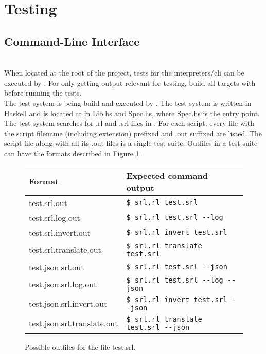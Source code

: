 \section{Testing}


\subsection{Command-Line Interface}
\\

When located at the root of the project, tests for the interpreters/cli can be executed by .
For only getting output relevant for testing, build all targets with  before running the tests.\\

The test-system is being build and executed by .
The test-system is written in Haskell and is located at  in Lib.hs and Spec.hs, where Spec.hs is the entry point.
The test-system searches for .rl and .srl files in .
For each script, every file with the script filename (including extension) prefixed and .out suffixed are listed.
The script file along with all its .out files is a single test suite.
Outfiles in a test-suite can have the formats described in Figure \ref{fig:test_suite_formats}.

\begin{figure}[H]
  \center
  \begin{tabular}{|l|l|}\hline
    \textbf{Format}             & \textbf{Expected command output}\\\hline
    test.srl.out                & \texttt{\$ srl.rl test.srl}\\\hline
    test.srl.log.out            & \texttt{\$ srl.rl test.srl {-}{-}log}\\\hline
    test.srl.invert.out         & \texttt{\$ srl.rl invert test.srl}\\\hline
    test.srl.translate.out      & \texttt{\$ srl.rl translate test.srl}\\\hline
    test.json.srl.out           & \texttt{\$ srl.rl test.srl {-}{-}json}\\\hline
    test.json.srl.log.out       & \texttt{\$ srl.rl test.srl {-}{-}log {-}{-}json}\\\hline
    test.json.srl.invert.out    & \texttt{\$ srl.rl invert test.srl {-}{-}json}\\\hline
    test.json.srl.translate.out & \texttt{\$ srl.rl translate test.srl {-}{-}json}\\\hline
  \end{tabular}
  \caption{Possible outfiles for the file test.srl.}
  \label{fig:test_suite_formats}
\end{figure}

